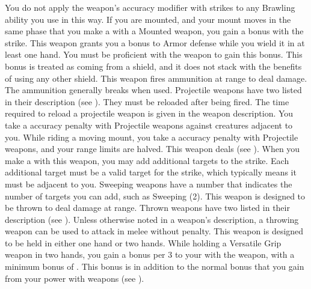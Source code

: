     You do not apply the weapon's accuracy modifier with strikes to any Brawling ability you use in this way.
    \label{Mounted Weapon} If you are mounted, and your mount moves in the same phase that you make a  with a Mounted weapon, you gain a   bonus with the strike.
     This weapon grants you a  bonus to Armor defense while you wield it in at least one hand.
    You must be proficient with the weapon to gain this bonus.
    This bonus is treated as coming from a shield, and it does not stack with the benefits of using any other shield.
     This weapon fires ammunition at range to deal damage.
    The ammunition generally breaks when used.
    Projectile weapons have two  listed in their description (see ).
    They must be reloaded after being fired.
    The time required to reload a projectile weapon is given in the weapon description.
    You take a  accuracy penalty with Projectile weapons against creatures adjacent to you.
    While riding a moving mount, you take a  accuracy penalty with Projectile weapons, and your range limits are halved.
     This weapon deals  (see ).
    \label{Sweeping} When you make a   with this weapon, you may add additional targets to the strike.
    Each additional target must be a valid target for the strike, which typically means it must be adjacent to you.
    Sweeping weapons have a number that indicates the number of targets you can add, such as Sweeping (2).
     This weapon is designed to be thrown to deal damage at range.
    Thrown weapons have two  listed in their description (see ).
    Unless otherwise noted in a weapon's description, a throwing weapon can be used to attack in melee without penalty.
     This weapon is designed to be held in either one hand or two hands.
    While holding a Versatile Grip weapon in two hands, you gain a  bonus per 3  to your  with the weapon, with a minimum bonus of .
    This bonus is in addition to the normal bonus that you gain from your power with weapons (see ).

